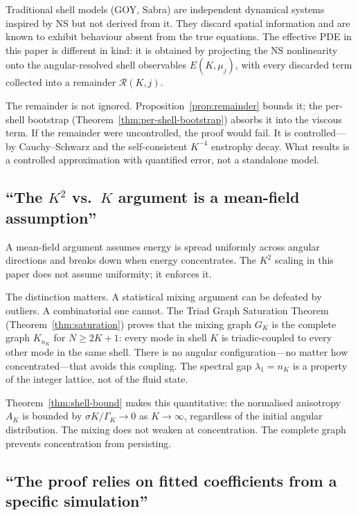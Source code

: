 \documentclass[11pt,a4paper]{article}
\theoremstyle{remark}
\begin{document}
Traditional shell models (GOY, Sabra) are independent dynamical systems inspired by NS but not derived from it.  They discard spatial information and are known to exhibit behaviour absent from the true equations.  The effective PDE in this paper is different in kind: it is obtained by projecting the NS nonlinearity onto the angular-resolved shell observables $E(K, \mu_j)$, with every discarded term collected into a remainder $\mathcal{R}(K,j)$.

The remainder is not ignored.  Proposition~\ref{prop:remainder} bounds it; the per-shell bootstrap (Theorem~\ref{thm:per-shell-bootstrap}) absorbs it into the viscous term.  If the remainder were uncontrolled, the proof would fail.  It is controlled---by Cauchy--Schwarz and the self-consistent $K^{-4}$ enstrophy decay.  What results is a controlled approximation with quantified error, not a standalone model.

\subsection{``The $K^2$ vs.\ $K$ argument is a mean-field assumption''}

A mean-field argument assumes energy is spread uniformly across angular directions and breaks down when energy concentrates.  The $K^2$ scaling in this paper does not assume uniformity; it enforces it.

The distinction matters.  A statistical mixing argument can be defeated by outliers.  A combinatorial one cannot.  The Triad Graph Saturation Theorem (Theorem~\ref{thm:saturation}) proves that the mixing graph $G_K$ is the complete graph $K_{n_K}$ for $N \geq 2K+1$: every mode in shell $K$ is triadic-coupled to every other mode in the same shell.  There is no angular configuration---no matter how concentrated---that avoids this coupling.  The spectral gap $\lambda_1 = n_K$ is a property of the integer lattice, not of the fluid state.

Theorem~\ref{thm:shell-bound} makes this quantitative: the normalised anisotropy $A_K$ is bounded by $\sigma K / \Gamma_K \to 0$ as $K \to \infty$, regardless of the initial angular distribution.  The mixing does not weaken at concentration.  The complete graph prevents concentration from persisting.

\subsection{``The proof relies on fitted coefficients from a specific simulation''}
\end{document}
